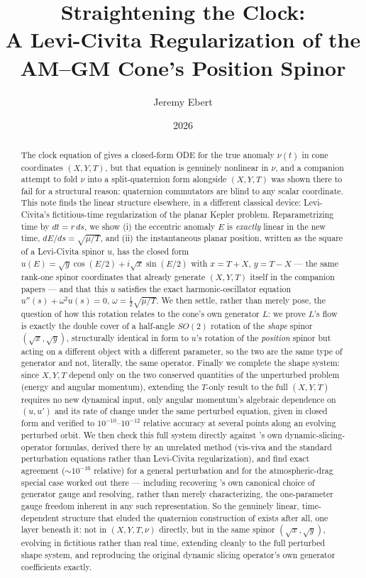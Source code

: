 \documentclass[12pt]{amsart}
\title[Levi-Civita Regularization on the AM--GM Cone]{Straightening the Clock:\\
A Levi-Civita Regularization of the AM--GM Cone's Position Spinor}
\author{Jeremy Ebert}
\date{2026}
\theoremstyle{plain}
\theoremstyle{remark}
\begin{document}
\maketitle

\begin{abstract}
The clock equation of \cite{Ebert2026Clock} gives a closed-form ODE for the true anomaly $\nu(t)$ in cone coordinates $(X,Y,T)$, but that equation is genuinely nonlinear in $\nu$, and a companion attempt to fold $\nu$ into a split-quaternion form alongside $(X,Y,T)$ was shown there to fail for a structural reason: quaternion commutators are blind to any scalar coordinate. This note finds the linear structure elsewhere, in a different classical device: Levi-Civita's fictitious-time regularization of the planar Kepler problem. Reparametrizing time by $dt=r\,ds$, we show (i) the eccentric anomaly $E$ is \emph{exactly} linear in the new time, $dE/ds=\sqrt{\mu/T}$, and (ii) the instantaneous planar position, written as the square of a Levi-Civita spinor $u$, has the closed form $u(E)=\sqrt{y}\cos(E/2)+i\sqrt{x}\sin(E/2)$ with $x=T+X$, $y=T-X$ --- the same rank-one spinor coordinates that already generate $(X,Y,T)$ itself in the companion papers --- and that this $u$ satisfies the exact harmonic-oscillator equation $u''(s)+\omega^2u(s)=0$, $\omega=\tfrac12\sqrt{\mu/T}$. We then settle, rather than merely pose, the question of how this rotation relates to the cone's own generator $L$: we prove $L$'s flow is exactly the double cover of a half-angle $SO(2)$ rotation of the \emph{shape} spinor $(\sqrt x,\sqrt y)$, structurally identical in form to $u$'s rotation of the \emph{position} spinor but acting on a different object with a different parameter, so the two are the same type of generator and not, literally, the same operator. Finally we complete the shape system: since $X,Y,T$ depend only on the two conserved quantities of the unperturbed problem (energy and angular momentum), extending the $T$-only result to the full $(\dot X,\dot Y,\dot T)$ requires no new dynamical input, only angular momentum's algebraic dependence on $(u,u')$ and its rate of change under the same perturbed equation, given in closed form and verified to $10^{-10}$--$10^{-12}$ relative accuracy at several points along an evolving perturbed orbit. We then check this full system directly against \cite{Ebert2026Cone}'s own dynamic-slicing-operator formulas, derived there by an unrelated method (vis-viva and the standard perturbation equations rather than Levi-Civita regularization), and find exact agreement ($\sim10^{-16}$ relative) for a general perturbation and for the atmospheric-drag special case worked out there --- including recovering \cite{Ebert2026Cone}'s own canonical choice of generator gauge and resolving, rather than merely characterizing, the one-parameter gauge freedom inherent in any such representation. So the genuinely linear, time-dependent structure that eluded the quaternion construction of \cite{Ebert2026Clock} exists after all, one layer beneath it: not in $(X,Y,T,\nu)$ directly, but in the same spinor $(\sqrt x,\sqrt y)$, evolving in fictitious rather than real time, extending cleanly to the full perturbed shape system, and reproducing the original dynamic slicing operator's own generator coefficients exactly.

\end{abstract}
\end{document}
